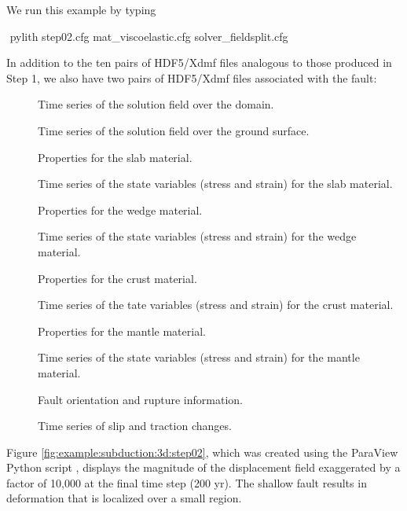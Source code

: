We run this example by typing
\begin{shell}
$$ pylith step02.cfg mat_viscoelastic.cfg solver_fieldsplit.cfg
\end{shell}
In addition to the ten pairs of HDF5/Xdmf files analogous to those
produced in Step 1, we also have two pairs of HDF5/Xdmf files
associated with the fault:
\begin{description}
\item[] Time series of the solution field over the domain.
\item[] Time series of the solution field over the ground surface.
\item[] Properties for
  the slab material.
\item[] Time series of the state variables (stress and strain) for the slab material.
\item[] Properties for
  the wedge material.
\item[] Time series of the state variables (stress and strain) for the wedge material.
\item[] Properties for
  the crust material.
\item[] Time series of the tate variables
  (stress and strain) for the crust material.
\item[] Properties for
  the mantle material.
\item[] Time series of the state variables
  (stress and strain) for the mantle material.
\item[] Fault orientation
  and rupture information.
\item[] Time series of slip and
  traction changes.
\end{description}

Figure \ref{fig:example:subduction:3d:step02}, which was created
using the ParaView Python script ,
displays the magnitude of the displacement field exaggerated by a
factor of 10,000 at the final time step (200 yr).  The shallow
fault results in deformation that is localized over a small region.

